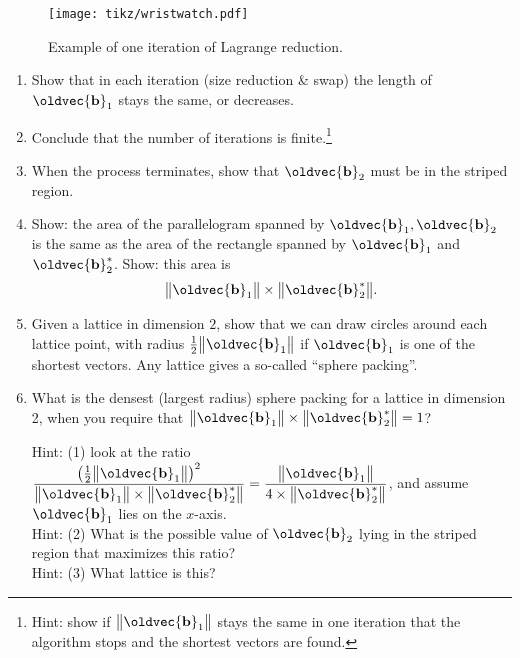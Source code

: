 \documentclass[10pt,a4paper]{article}
\renewcommand{\vec}[1]{\oldvec{\mathbf{#1}}}
\DeclarePairedDelimiter{\norm}{\big\lVert}{\big\rVert}
\begin{document}
\begin{figure}[h!]
	\centering\texttt{[image: tikz/wristwatch.pdf]}
	\caption{Example of one iteration of Lagrange reduction.}\label{fig:wristwatch}
\end{figure}

\begin{enumerate}
	\item
		Show that in each iteration (size reduction \& swap) the length of \(\vec{b}_1\) stays the same, or decreases.
	
	\item Conclude that the number of iterations is finite.\footnote{Hint: show if \(\norm{\vec{b}_1}\) stays the same in one iteration that the algorithm stops and the shortest vectors are found.}

	\item When the process terminates, show that \(\vec{b}_2\) must be in the striped region.

	\item Show: the area of the parallelogram spanned by \(\vec{b}_1, \vec{b}_2\) is the same as the area of the rectangle spanned by \(\vec{b}_1\) and \(\vec{b}_2^*\). Show: this area is
	\[
		\norm{\vec{b}_1} \times \norm{\vec{b}_2^*}.
	\]

	\item
		Given a lattice in dimension \(2\), show that we can draw circles around each lattice point, with radius \(\frac12 \norm{\vec{b}_1}\) if \(\vec{b}_1\) is one of the shortest vectors.
		Any lattice gives a so-called ``sphere packing''.
	
	\item What is the densest (largest radius) sphere packing for a lattice in dimension 2,
		when you require that \(\norm{\vec{b}_1} \times \norm{\vec{b}_2^*} = 1\)?

		Hint: (1) look at the ratio \(\displaystyle \frac{{\left(\frac12 \norm{\vec{b}_1}\right)}^2}{\norm{\vec{b}_1} \times \norm{\vec{b}_2^*}} = \frac{\norm{\vec{b}_1}}{4 \times \norm{\vec{b}_2^*}}\), and assume \(\vec{b}_1\) lies on the \(x\)-axis. \\
		{\color{white}Hint: }(2) What is the possible value of \(\vec{b}_2\) lying in the striped region that maximizes this ratio? \\
		{\color{white}Hint: }(3) What lattice is this?
		

\end{enumerate}
\end{document}
